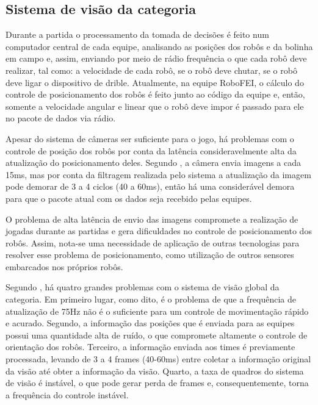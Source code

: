 \documentclass[acronym, symbols, table]{fei}
\begin{document}
		\subsection{Sistema de visão da categoria }
		
			Durante a partida o processamento da tomada de decisões é feito num computador central de cada equipe, analisando as posições dos robôs e da bolinha em campo e, assim, enviando por meio de rádio frequência o que cada robô deve realizar, tal como: a velocidade de cada robô, se o robô deve chutar, se o robô deve ligar o dispositivo de drible. Atualmente, na equipe RoboFEI, o cálculo do controle de posicionamento dos robôs é feito junto ao código da equipe e, então, somente a velocidade angular e linear que o robô deve impor é passado para ele no pacote de dados via rádio.
		
			Apesar do sistema de câmeras ser suficiente para o jogo, há problemas com o controle de posição dos robôs por conta da latência consideravelmente alta da atualização do posicionamento deles. Segundo \textcite{tdpZJUNlict2020}, a câmera envia imagens a cada 15ms, mas por conta da filtragem realizada pelo sistema a atualização da imagem pode demorar de 3 a 4 ciclos (40 a 60ms), então há uma considerável demora para que o pacote atual com os dados seja recebido pelas equipes.
			
			O problema de alta latência de envio das imagens compromete a realização de jogadas durante as partidas e gera dificuldades no controle de posicionamento dos robôs. Assim, nota-se uma necessidade de aplicação de outras tecnologias para resolver esse problema de posicionamento, como utilização de outros sensores embarcados nos próprios robôs.
			
			Segundo \textcite{tdpZJUNlict2020}, há quatro grandes problemas com o sistema de visão global da categoria. Em primeiro lugar, como dito, é o problema de que a frequência de atualização de 75Hz não é o suficiente para um controle de movimentação rápido e acurado. Segundo, a informação das posições que é enviada para as equipes possui uma quantidade alta de ruído, o que compromete altamente o controle de orientação dos robôs. Terceiro, a informação enviada aos times é previamente processada, levando de 3 a 4 frames (40-60ms) entre coletar a informação original da visão até obter a informação da visão. Quarto, a taxa de quadros do sistema de visão é instável, o que pode gerar perda de frames e, consequentemente, torna a frequência do controle instável.
			
\end{document}
